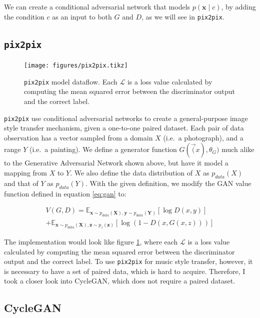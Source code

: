 \documentclass[12pt,a4paper,]{report}
\begin{document}
We can create a conditional adversarial network that models
\(p(\mathbf{x} \mid c)\), by adding the condition \(c\) as an input to
both \(G\) and \(D\), as we will see in \texttt{pix2pix}.

\hypertarget{pix2pix}{%
\subsection{\texorpdfstring{\texttt{pix2pix}}{pix2pix}}\label{pix2pix}}

\begin{figure}[h]
    \texttt{[image: figures/pix2pix.tikz]}
    \centering
    \caption[\texttt{pix2pix} model dataflow]{\texttt{pix2pix} model dataflow. Each $\mathcal{L}$ is a loss value calculated by computing the mean squared error between the discriminator output and the correct label. \label{fig:pix2pix}}
\end{figure}

\texttt{pix2pix} use conditional adversarial networks to create a
general-purpose image style transfer mechanism, given a one-to-one
paired dataset. Each pair of data observation has a vector sampled from
a domain \(X\) (i.e.~a photograph), and a range \(Y\) (i.e.~a painting).
We define a generator function \(G(\vec(x), \theta_G)\) much alike to
the Generative Adversarial Network shown above, but have it model a
mapping from \(X\) to \(Y\). We also define the data distribution of
\(X\) as \(p_{data}(X)\) and that of \(Y\) as \(p_{data}(Y)\). With the
given definition, we modify the GAN value function defined in equation
\ref{eq:gan} to:

\begin{multline}
    V(G, D) = \mathbb{E}_{\mathbf{x} \sim p_{data}(\mathbf{X}), \mathbf{y} \sim p_{data}(\mathbf{Y})}[\log D(x, y)] \\ +  \mathbb{E}_{\mathbf{x} \sim p_{data}(\mathbf{X}), \mathbf{z} \sim p_{z}(\mathbf{z})}[\log (1 - D(x, G(x, z)))] \label{eq:pix2pix}
\end{multline}

The implementation would look like figure \ref{fig:pix2pix}, where each
\(\mathcal{L}\) is a loss value calculated by computing the mean squared
error between the discriminator output and the correct label. To use
\texttt{pix2pix} for music style transfer, however, it is necessary to
have a set of paired data, which is hard to acquire. Therefore, I took a
closer look into CycleGAN, which does not require a paired dataset.

\hypertarget{cyclegan}{%
\subsection{CycleGAN}\label{cyclegan}}
\end{document}
